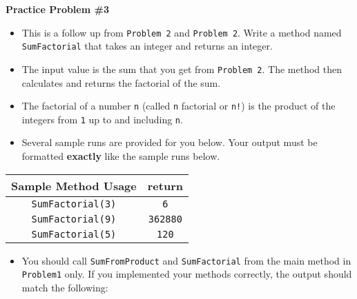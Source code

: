 \documentclass[12pt]{article}
\begin{document}
\noindent\textbf{Practice Problem \#3}
\begin{itemize}
	\item This is a follow up from \texttt{Problem 2} and \texttt{Problem 2}. Write a method named \texttt{SumFactorial} that takes an integer and returns an integer.
	\item The input value is the sum that you get from \texttt{Problem 2}. The method then calculates and returns the factorial of the sum.
	\item The factorial of a number \texttt{n} (called \texttt{n} factorial or \texttt{n!}) is the product of the integers from \texttt{1} up to and including \texttt{n}.
	\item Several sample runs are provided for you below. Your output must be formatted \textbf{exactly} like the sample runs below.
\end{itemize}
\begin{center}
\begin{tabular}{| c | c |}
\hline\rule{0pt}{4ex}
Sample Method Usage & return \\
\hline\rule{0pt}{4ex}
\texttt{SumFactorial(3)} & \texttt{6}\\
\hline\rule{0pt}{4ex}
\texttt{SumFactorial(9)} & \texttt{362880}\\
\hline\rule{0pt}{4ex}
\texttt{SumFactorial(5)} & \texttt{120}\\
\hline
\end{tabular}
\end{center}
\begin{itemize}
\item You should call \texttt{SumFromProduct} and \texttt{SumFactorial} from the main method in \texttt{Problem1} only. If you implemented your methods correctly, the output should match the following:
\end{itemize}
\end{document}
